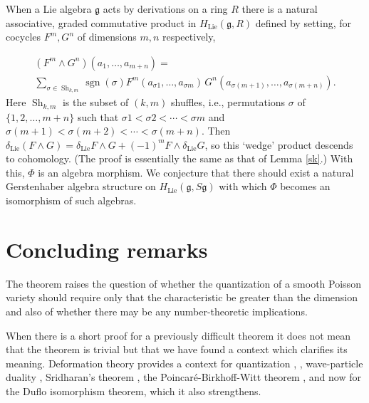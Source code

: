 \documentclass{amsart}
\begin{document}
When a Lie algebra ${\mathfrak{g}}$ acts by derivations on a ring $R$ there is a natural associative, graded commutative  product in ${\ensuremath{H_{\text{Lie}}}}({\mathfrak{g}},R)$ defined by setting, for cocycles $F^m, G^n$ of dimensions $m,n$ respectively,

\begin{multline*}\label{wedge}
(F^m \wedge G^n)(a_1,\dots, a_{m+n}) = \\
\sum _{\sigma \in {\operatorname{Sh}}_{k,m}} {\operatorname{sgn}}(\sigma) F^m (a_{\sigma 1},\dots, a_{\sigma m}) \,G^n(a_{\sigma (m+1)},\dots, a_{\sigma (m+n)}).
 \end{multline*} 
Here ${\operatorname{Sh}}_{k,m} $ is the subset of $(k,m)$ shuffles, i.e., permutations $\sigma$ of  $\{1, 2, \dots, m+n\}$ such that $\sigma 1 <\sigma 2 <\cdots< \sigma m$ and $\sigma(m+1) < \sigma(m + 2) < \cdots < \sigma(m+n)$.
Then ${\ensuremath{\delta_{\text{Lie}}}}(F\wedge G) = {\ensuremath{\delta_{\text{Lie}}}} F \wedge G +(-1)^mF\wedge {\ensuremath{\delta_{\text{Lie}}}} G$, so this `wedge' product descends to cohomology. (The proof is essentially the same as that of Lemma \ref{sk}.)  With this, $\Phi$ is an algebra morphism.  We conjecture that there should exist a natural Gerstenhaber algebra structure on ${\ensuremath{H_{\text{Lie}}}}({\mathfrak{g}}, S{\mathfrak{g}})$ with which $\Phi$ becomes an isomorphism of such algebras.

\section{Concluding remarks}
The theorem raises the question of whether the quantization of a smooth Poisson variety should require only that the characteristic be greater than the dimension and also of whether there may be any number-theoretic implications.

When there is a short proof for a previously difficult theorem it does not mean that the theorem is trivial but that we have found a context which clarifies its meaning. Deformation theory provides a context for quantization \cite{BFFLS}, \cite{DitoSternheimer:Genesis}, wave-particle duality \cite{G:Semigroups}, Sridharan's theorem \cite{GerstGiaquint:Weyl}, the Poincar{\'e}-Birkhoff-Witt theorem \cite{BravermanGaitsgory:PBW}, and now for the Duflo isomorphism theorem, which it also strengthens.
\end{document}
